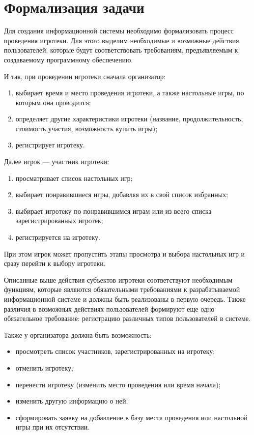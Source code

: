 \section{Формализация задачи}

Для создания информационной системы необходимо формализовать процесс проведения
игротеки. Для этого выделим необходимые и возможные действия пользователей,
которые будут соответствовать требованиям, предъявляемым к
создаваемому программному обеспечению.

И так, при проведении игротеки сначала организатор:
\begin{enumerate}[label=\arabic*)]
    \item выбирает время и место проведения игротеки, а также настольные игры,
      по которым она проводится;
    \item определяет другие характеристики игротеки (название,
        продолжительность, стоимость участия, возможность купить игры);
    \item регистрирует игротеку.
\end{enumerate}

Далее игрок --- участник игротеки:
\begin{enumerate}[label=\arabic*)]
    \item просматривает список настольных игр;
    \item выбирает понравившиеся игры, добавляя их в свой список избранных;
    \item выбирает игротеку по понравившимся играм или из всего списка
        зарегистрированных игротек;
    \item регистрируется на игротеку.
\end{enumerate}

При этом игрок может пропустить этапы просмотра и выбора настольных игр и
сразу перейти к выбору игротеки.

Описанные выше действия субъектов игротеки соответствуют необходимым функциям,
которые являются обязательными требованиями к разрабатываемой информационной
системе и должны быть реализованы в первую очередь. Также различия в возможных
действиях пользователей формируют еще одно обязательное требование: регистрацию
различных типов пользователей в системе.

Также у организатора должна быть возможность:
\begin{itemize}
    \item просмотреть список участников, зарегистрированных на игротеку;
    \item отменить игротеку;
    \item перенести игротеку (изменить место проведения или время начала);
    \item изменить другую информацию о ней;
    \item сформировать заявку на добавление в базу места проведения или
        настольной игры при их отсутствии.
\end{itemize}

